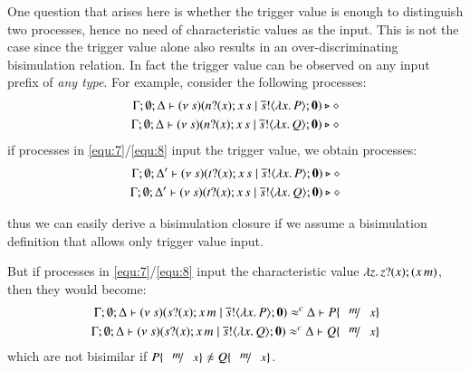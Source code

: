 \begin{example}
	One question that arises here is whether the trigger value is enough
	to distinguish two processes, hence no need of 
	characteristic values as the input. 
	This is not the case since the trigger value
	alone also results in an over-discriminating bisimulation relation.
	In fact the  trigger value can be observed on any input prefix
	of {\em any type}. For example, consider the following processes:
%
	\begin{eqnarray}
		\Gamma; \emptyset; \Delta \vdash (\nu\ s)(n ? (x) ; x\,s \;|\; \overline{s} ! \langle \lambda x.\,P \rangle ; \mathbf{0}) \triangleright \diamond\label{equ:7}
		\\
		\Gamma; \emptyset; \Delta \vdash (\nu\ s)(n ? (x) ; x\,s \;|\; \overline{s} ! \langle \lambda x.\,Q \rangle ; \mathbf{0}) \triangleright \diamond\label{equ:8}
	\end{eqnarray}
%
	\noi if processes in \eqref{equ:7}/\eqref{equ:8}
	input the trigger value, we obtain processes:
%
	\begin{eqnarray*}
		\Gamma; \emptyset; \Delta' \vdash  (\nu\ s)(t ? (x) ; x\,s \;|\; \overline{s} ! \langle \lambda x.\,P \rangle ; \mathbf{0}) \triangleright \diamond
		\\
		\Gamma; \emptyset; \Delta' \vdash  (\nu\ s)(t ? (x) ; x\,s \;|\; \overline{s} ! \langle \lambda x.\,Q \rangle ; \mathbf{0}) \triangleright \diamond
	\end{eqnarray*}

	\noi thus we can easily derive a bisimulation closure if we 
	assume a bisimulation definition that allows only trigger value input.

	But if processes in \eqref{equ:7}/\eqref{equ:8}
	input the characteristic value $\lambda z.\,z ? (x) ; (x\,m)$,  
	then they would become:
	\begin{eqnarray*}
		\Gamma; \es; \Delta \proves \newsp{s}{\binp{s}{x} \appl{x}{m} \Par \bout{\dual{s}}{\abs{x} P} \inact} \wbc \Delta \proves P \subst{m}{x}
		\\
		\Gamma; \es; \Delta \proves \newsp{s}{\binp{s}{x} \appl{x}{m} \Par \bout{\dual{s}}{\abs{x} Q} \inact} \wbc \Delta \proves Q \subst{m}{x}
	\end{eqnarray*}
	\noi which are not bisimilar if $P \subst{m}{x} \not\wb Q \subst{m}{x}$.
\end{example}

